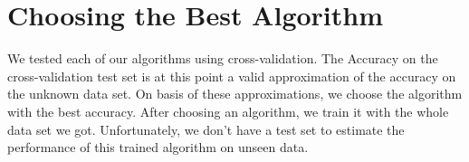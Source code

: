 \documentclass{article}
\begin{document}
\section{Choosing the Best Algorithm}
We tested each of our algorithms using cross-validation. The Accuracy on the cross-validation test set is at this point a valid approximation of the accuracy on the unknown data set. On basis of these approximations, we choose the algorithm with the best accuracy.
After choosing an algorithm, we train it with the whole data set we got. Unfortunately, we don't have a test set to estimate the performance of this trained algorithm on unseen data.



\end{document}
